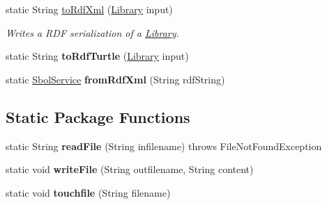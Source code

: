 \begin{DoxyCompactItemize}
static String \hyperlink{classorg_1_1sbolstandard_1_1lib_s_b_o_lj_1_1_i_o_tools_a25d16649fdc5acaee48925e3139362bb}{toRdfXml} (\hyperlink{classorg_1_1sbolstandard_1_1lib_s_b_o_lj_1_1_library}{Library} input)
\begin{DoxyCompactList}\small\item\em Writes a RDF serialization of a \hyperlink{classorg_1_1sbolstandard_1_1lib_s_b_o_lj_1_1_library}{Library}. \item\end{DoxyCompactList}\item 
\hypertarget{classorg_1_1sbolstandard_1_1lib_s_b_o_lj_1_1_i_o_tools_a72f78d6112c3399286726cb1d8aed96d}{
static String {\bfseries toRdfTurtle} (\hyperlink{classorg_1_1sbolstandard_1_1lib_s_b_o_lj_1_1_library}{Library} input)}
\label{classorg_1_1sbolstandard_1_1lib_s_b_o_lj_1_1_i_o_tools_a72f78d6112c3399286726cb1d8aed96d}

\item 
\hypertarget{classorg_1_1sbolstandard_1_1lib_s_b_o_lj_1_1_i_o_tools_ae60c9b109f6f9014815b145ea1897774}{
static \hyperlink{classorg_1_1sbolstandard_1_1lib_s_b_o_lj_1_1_sbol_service}{SbolService} {\bfseries fromRdfXml} (String rdfString)}
\label{classorg_1_1sbolstandard_1_1lib_s_b_o_lj_1_1_i_o_tools_ae60c9b109f6f9014815b145ea1897774}

\end{DoxyCompactItemize}
\subsection*{Static Package Functions}
\begin{DoxyCompactItemize}
\item 
\hypertarget{classorg_1_1sbolstandard_1_1lib_s_b_o_lj_1_1_i_o_tools_a5bc5815e51237358fbf1d0dd63f64fcf}{
static String {\bfseries readFile} (String infilename)  throws FileNotFoundException }
\label{classorg_1_1sbolstandard_1_1lib_s_b_o_lj_1_1_i_o_tools_a5bc5815e51237358fbf1d0dd63f64fcf}

\item 
\hypertarget{classorg_1_1sbolstandard_1_1lib_s_b_o_lj_1_1_i_o_tools_a750e5055e036f1092374d6f800093187}{
static void {\bfseries writeFile} (String outfilename, String content)}
\label{classorg_1_1sbolstandard_1_1lib_s_b_o_lj_1_1_i_o_tools_a750e5055e036f1092374d6f800093187}

\item 
\hypertarget{classorg_1_1sbolstandard_1_1lib_s_b_o_lj_1_1_i_o_tools_a258a9cf42dbe73be9eb2baf3719ad2d0}{
static void {\bfseries touchfile} (String filename)}
\label{classorg_1_1sbolstandard_1_1lib_s_b_o_lj_1_1_i_o_tools_a258a9cf42dbe73be9eb2baf3719ad2d0}

\end{DoxyCompactItemize}


